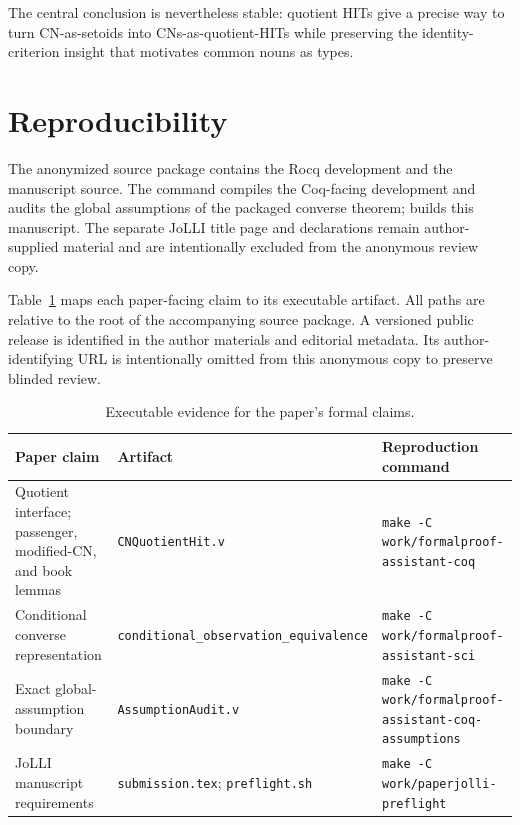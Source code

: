 \documentclass[11pt]{article}
\begin{document}
The central conclusion is nevertheless stable: quotient HITs give a precise
way to turn CN-as-setoids into CNs-as-quotient-HITs while preserving the
identity-criterion insight that motivates common nouns as types.

\section*{Reproducibility}

The anonymized source package contains the Rocq development and the manuscript
source.  The command  compiles
the Coq-facing development and audits the global assumptions of the packaged
converse theorem;  builds this
manuscript.  The separate JoLLI title page and declarations remain author-
supplied material and are intentionally excluded from the anonymous review
copy.

Table~\ref{tab:artifact-map} maps each paper-facing claim to its executable
artifact.  All paths are relative to the root of the accompanying source
package.  A versioned public release is identified in the author materials and
editorial metadata.  Its author-identifying URL is intentionally omitted from
this anonymous copy to preserve blinded review.

\begin{table}[H]
\centering
\small
\caption{Executable evidence for the paper's formal claims.}
\label{tab:artifact-map}
\begin{tabularx}{\textwidth}{@{}>{\raggedright\arraybackslash}p{}>{\raggedright\arraybackslash}p{}X@{}}
\toprule
Paper claim & Artifact & Reproduction command \\
\midrule
Quotient interface; passenger, modified-CN, and book lemmas &
\texttt{CNQuotientHit.v} &
\texttt{make -C work/formal}\newline\texttt{proof-assistant-coq} \\
Conditional converse representation &
{\scriptsize\texttt{conditional\_observation\_}\newline\texttt{equivalence}} &
\texttt{make -C work/formal}\newline\texttt{proof-assistant-sci} \\
Exact global-assumption boundary &
\texttt{AssumptionAudit.v} &
\texttt{make -C work/formal}\newline\texttt{proof-assistant-coq-assumptions} \\
JoLLI manuscript requirements &
\texttt{submission.tex}; \texttt{preflight.sh} &
\texttt{make -C work/paper}\newline\texttt{jolli-preflight} \\
\bottomrule
\end{tabularx}
\end{table}
\end{document}

